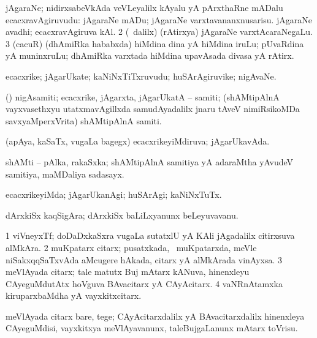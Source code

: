 {{{{{{\bentry
{} 
\gl{\nA}
\expl{}
\bmng
\bnum
{} 
\banum
{} jAgaraNe; nidirxsabeVkAda veVLeyalilx kAyalu yA pArxthaRne mADalu ecacxravAgiruvudu:  jAgaraNe mADu; jAgaraNe varxtavananxnusarisu. 
 jAgaraNe avadhi; ecacxravAgiruva kAl. 
\eanum
\numie
\num{2} (\sA\ \bava dalilx) (rAtirxya) jAgaraNe varxtAcaraNegaLu. 
\num{3} (cacuR) (dhAmiRka hababxda) hiMdina dina yA hiMdina iruLu; pUvaRdina yA muninxruLu; dhAmiRka varxtada hiMdina upavAsada divasa yA rAtirx. 
\enum
\emng
\eentry

\bentry
{} 
\gl{\nA}
\expl{}
\bmng
ecacxrike; jAgarUkate; kaNiNxTiTxruvudu; huSArAgiruvike; nigAvaNe. 
\emng
\eentry

\bentry
{}
\gl{\nA}
\expl{}
\bmng
 (\ame) nigAsamiti; ecacxrike, jAgarxta, jAgarUkatA -- samiti; (shAMtipAlnA vayxvasethxyu utatxmavAgillxda samudAyadalilx jnaru tAveV nimiRsikoMDa savxyaMperxVrita) shAMtipAlnA samiti. 
\emng
\eentry

\bentry
{} 
\gl{\gu}
\expl{}
\bmng
 (apAya, kaSaTx, \mo vugaLa bagegx) ecacxrikeyiMdiruva; jAgarUkavAda. 
\emng
\eentry

\bentry
{} 
\gl{\nA}
\expl{}
\bmng
 shAMti -- pAlka, rakaSxka; shAMtipAlnA samitiya yA adaraMtha yAvudeV samitiya, maMDaliya sadasayx. 
\emng
\eentry

\bentry
{} 
\gl{\kirxvi}
\expl{}
\bmng
 ecacxrikeyiMda; jAgarUkanAgi; huSArAgi; kaNiNxTuTx. 
\emng
\eentry

\bentry
{} 
\gl{\nA}
\expl{}
\bmng
 dArxkiSx kaqSigAra; dArxkiSx baLiLxyanunx beLeyuvavanu. 
\emng
\eentry

\bentry
{} 
\gl{\nA}
\expl{}
\bmng
\bnum
\num{1} viVneyxTf; doDaDxkaSxra \mo vugaLa sutatxlU yA KAli jAgadalilx citirxsuva alMkAra. 
\num{2} muKpatarx citarx; pusatxkada, \kanmu\ muKpatarxda, meVle niSakxqqSaTxvAda aMcugere hAkada, citarx yA alMkArada vinAyxsa. 
\num{3} meVlAyada citarx; tale matutx Buj mAtarx kANuva, hinenxleyu CAyeguMdutAtx hoVguva BAvacitarx yA CAyAcitarx. 
\num{4} vaNRnAtamxka kiruparxbaMdha yA vayxkitxcitarx. 
\enum
\emng
\eentry

\bentry
{} 
\gl{\sakirx}
\expl{}
\bmng
 meVlAyada citarx bare, tege; CAyAcitarxdalilx yA BAvacitarxdalilx hinenxleya CAyeguMdisi, vayxkitxya meVlAyavanunx, taleBujgaLanunx mAtarx toVrisu. 
\emng
\eentry

}}}}}}
